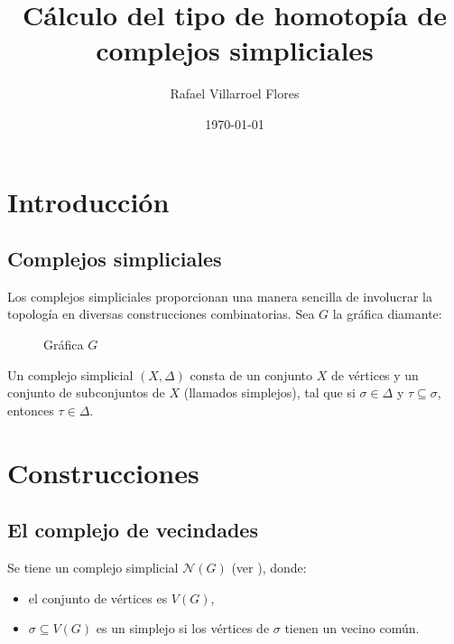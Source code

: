 \documentclass[final]{beamer}
\title[Congreso Virtual de la Sociedad Matemática Mexicana
19 al 23 de octubre de 2020] 
{%
Cálculo del tipo de homotopía de complejos simpliciales
}
\author{Rafael Villarroel Flores}
\institute{Universidad Autónoma del Estado de Hidalgo}
\date{\today}
\begin{document}
\begin{frame}[t]
\begin{multicols}{3}

\section{Introducción}

\subsection{Complejos simpliciales}

Los complejos simpliciales proporcionan una manera sencilla de
involucrar la topología en diversas construcciones combinatorias.
Sea $G$ la gráfica diamante:
\begin{figure}[htbp]
  \centering
\caption{Gráfica \(G\) \label{diamante}}
\end{figure}

Un \alert{complejo simplicial} \((X, \Delta)\) consta de un conjunto
\(X\) de \alert{vértices} y un conjunto de subconjuntos de \(X\)
(llamados \alert{simplejos}), tal que si \(\sigma\in\Delta\) y
\(\tau\subseteq\sigma\), entonces \(\tau\in\Delta\).

\section{Construcciones}

\subsection{El complejo de vecindades}

Se tiene un complejo simplicial \(\mathcal{N}(G)\) (ver \cite{ref1}),
donde:
\begin{itemize}
\item el conjunto de vértices es \(V(G)\),
\item \(\sigma\subseteq V(G)\) es un simplejo si los vértices de
\(\sigma\) tienen un vecino común.
\end{itemize}


\end{multicols}
\end{frame}
\end{document}
